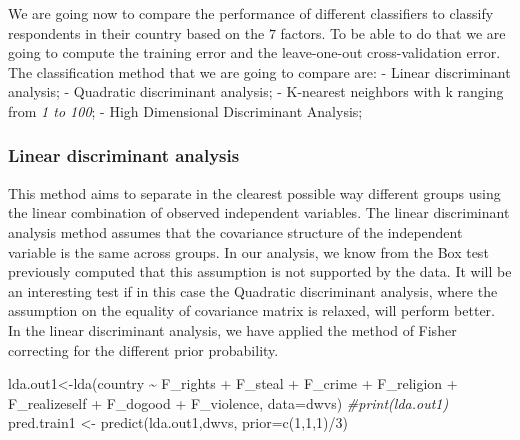 \documentclass[
  11pt,
]{article}
\newenvironment{Shaded}{\begin{snugshade}}{\end{snugshade}}
\newcommand{\AttributeTok}[1]{\textcolor[rgb]{0.77,0.63,0.00}{#1}}
\newcommand{\CommentTok}[1]{\textcolor[rgb]{0.56,0.35,0.01}{\textit{#1}}}
\newcommand{\DecValTok}[1]{\textcolor[rgb]{0.00,0.00,0.81}{#1}}
\newcommand{\FunctionTok}[1]{\textcolor[rgb]{0.00,0.00,0.00}{#1}}
\newcommand{\NormalTok}[1]{#1}
\newcommand{\OtherTok}[1]{\textcolor[rgb]{0.56,0.35,0.01}{#1}}
\newcommand{\SpecialCharTok}[1]{\textcolor[rgb]{0.00,0.00,0.00}{#1}}
\begin{document}
We are going now to compare the performance of different classifiers to classify respondents in their country based on the \(7\) factors. To be able to do that we are going to compute the training error and the leave-one-out cross-validation error.
The classification method that we are going to compare are:
- Linear discriminant analysis;
- Quadratic discriminant analysis;
- K-nearest neighbors with k ranging from \emph{1 to 100};
- High Dimensional Discriminant Analysis;

\hypertarget{linear-discriminant-analysis}{%
\subsubsection{Linear discriminant analysis}\label{linear-discriminant-analysis}}

This method aims to separate in the clearest possible way different groups using the linear combination of observed independent variables. The linear discriminant analysis method assumes that the covariance structure of the independent variable is the same across groups. In our analysis, we know from the Box test previously computed that this assumption is not supported by the data. It will be an interesting test if in this case the Quadratic discriminant analysis, where the assumption on the equality of covariance matrix is relaxed, will perform better.
In the linear discriminant analysis, we have applied the method of Fisher correcting for the different prior probability.

\begin{Shaded}
\begin{Highlighting}[]
\NormalTok{lda.out1}\OtherTok{\textless{}{-}}\FunctionTok{lda}\NormalTok{(country }\SpecialCharTok{\textasciitilde{}}\NormalTok{ F\_rights }\SpecialCharTok{+}\NormalTok{ F\_steal }\SpecialCharTok{+}\NormalTok{ F\_crime }\SpecialCharTok{+}\NormalTok{ F\_religion }\SpecialCharTok{+}\NormalTok{ F\_realizeself }\SpecialCharTok{+}
\NormalTok{                F\_dogood }\SpecialCharTok{+}\NormalTok{ F\_violence, }\AttributeTok{data=}\NormalTok{dwvs)}
\CommentTok{\#print(lda.out1)}
\NormalTok{pred.train1 }\OtherTok{\textless{}{-}} \FunctionTok{predict}\NormalTok{(lda.out1,dwvs, }\AttributeTok{prior=}\FunctionTok{c}\NormalTok{(}\DecValTok{1}\NormalTok{,}\DecValTok{1}\NormalTok{,}\DecValTok{1}\NormalTok{)}\SpecialCharTok{/}\DecValTok{3}\NormalTok{)}
\end{Highlighting}
\end{Shaded}

\begin{Shaded}
\end{Shaded}
\end{document}
